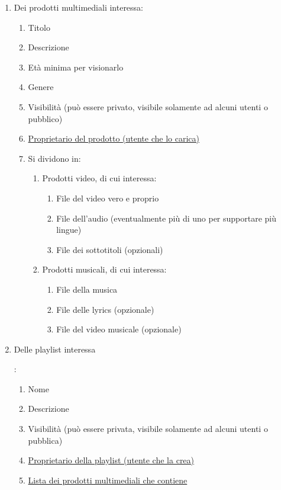 \begin{enumerate}
\item  \hypertarget{AnReqProdMult}{Dei prodotti multimediali interessa:}
	\begin{enumerate}[label*=\arabic*.]
	\item Titolo
	\item Descrizione
	\item Età minima per visionarlo
	\item Genere
	\item Visibilità (può essere privato, visibile solamente ad alcuni utenti o pubblico)
	\item \hyperlink{AnReqUt}{Proprietario del prodotto (utente che lo carica)}
	\item Si dividono in:
		\begin{enumerate}[label*=\arabic*.]
		\item \hypertarget{AnReqVideo}{Prodotti video, di cui interessa:}
			\begin{enumerate}[label*=\arabic*.]	
			\item File del video vero e proprio
			\item File dell'audio (eventualmente più di uno per supportare più lingue)
			\item File dei sottotitoli (opzionali)
			\end{enumerate}
		\item \hypertarget{AnReqMusicali}{Prodotti musicali, di cui interessa:}
			\begin{enumerate}[label*=\arabic*.]
			\item File della musica
			\item File delle lyrics (opzionale)
			\item File del video musicale (opzionale)
			\end{enumerate}
		\end{enumerate}
	\end{enumerate}

\item \hypertarget{AnReqPlaylist}{Delle playlist interessa}:
	\begin{enumerate}[label*=\arabic*.]
	\item Nome
	\item Descrizione
	\item Visibilità (può essere privata, visibile solamente ad alcuni utenti o pubblica)
	\item \hyperlink{AnReqUt}{Proprietario della playlist (utente che la crea)}
	\item \hyperlink{AnReqProdMult}{Lista dei prodotti multimediali che contiene}
	\end{enumerate}


\end{enumerate}
